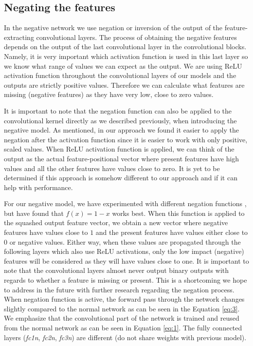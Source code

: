 \documentclass[b5paper]{book}
\let\cite\parencite
\begin{document}
\subsection{Negating the features}
\label{negation}

In the negative network we use negation or inversion of the output of the feature-extracting convolutional layers. The process of obtaining the negative features depends on the output of the last convolutional layer in the convolutional blocks. Namely, it is very important which activation function is used in this last layer so we know what range of values we can expect as the output. We are using ReLU activation function throughout the convolutional layers of our models and the outputs are strictly positive values. Therefore we can calculate what features are missing (negative features) as they have very low, close to zero values. 

It is important to note that the negation function can also be applied to the convolutional kernel directly as we described previously, when introducing the negative model. As mentioned, in our approach we found it easier to apply the negation after the activation function since it is easier to work with only positive, scaled values. When ReLU activation function is applied, we can think of the output as the actual feature-positional vector where present features have high values and all the other features have values close to zero. It is yet to be determined if this approach is somehow different to our approach and if it can help with performance.

For our negative model, we have experimented with different negation functions \cite{milovsevic2019classification}, but have found that \( f(x) = 1 - x \) works best. When this function is applied to the squashed output feature vector, we obtain a new vector where negative features have values close to \(1\) and the present features have values either close to \(0\) or negative values. Either way, when these values are propagated through the following layers which also use ReLU activations, only the low impact (negative) features will be considered as they will have values close to one. It is important to note that the convolutional layers almost never output binary outputs with regards to whether a feature is missing or present. This is a shortcoming we hope to address in the future with further research regarding the negation process. When negation function is active, the forward pass through the network changes slightly compared to the normal network as can be seen in the Equation \ref{eq:3}. We emphasize that the convolutional part of the network is trained and reused from the normal network as can be seen in Equation \ref{eq:1}. The fully connected layers (\emph{fc1n}, \emph{fc2n}, \emph{fc3n}) are different (do not share weights with previous model).
\end{document}
